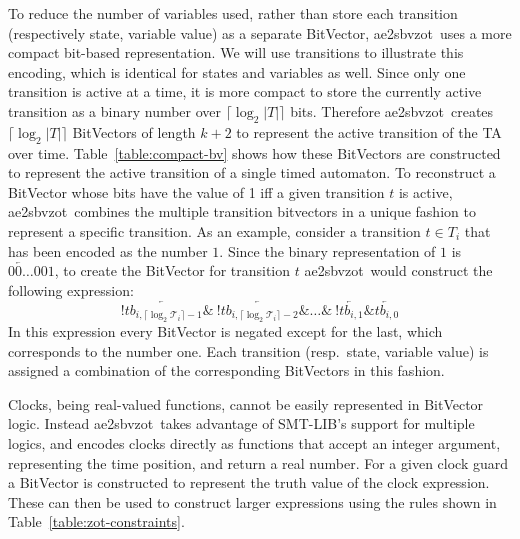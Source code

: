 \documentclass[a4paper,11pt]{report}
\newcommand*\BitAnd{\mathbin{\&}}
\newcommand{\BitNeg}{!}
\theoremstyle{definition}
\newcommand{\aez}{ae2sbvzot}
\begin{document}
To reduce the number of variables used, rather than store each transition
(respectively state, variable value) as a separate BitVector, \aez\ uses a more
compact bit-based representation. We will use transitions to illustrate this
encoding, which is identical for states and variables as well. Since only one
transition is active at a time, it is more compact to store the currently active
transition as a binary number over \(\lceil\log_2 |T|\rceil\) bits.
Therefore \aez\ creates \(\lceil\log_2 |T|\rceil\) BitVectors of
length \(k+2\) to represent the active transition of the TA over time.
Table~\ref{table:compact-bv} shows how these BitVectors are constructed to represent
the active transition of a single timed automaton. To reconstruct a BitVector
whose bits have the value of 1 iff a given transition $t$ is active, \aez\
combines the multiple transition bitvectors in a unique fashion to represent a
specific transition. As an example, consider a transition $t \in T_{i}$ that has
been encoded as the number $1$. Since the binary representation of $1$ is
$\overleftarrow{00\ldots}001$, to create the BitVector for transition $t$ \aez\
would construct the following expression:
\[\BitNeg\overleftarrow{tb_{i,\lceil \log_2 \mathcal{T}_i \rceil -1}} \BitAnd \ \BitNeg\overleftarrow{tb_{i,\lceil \log_2 \mathcal{T}_i \rceil -2}} \BitAnd \ldots \BitAnd \ \BitNeg\overleftarrow{tb_{i,1}} \BitAnd \overleftarrow{tb_{i,0}} \]
In this expression every BitVector is negated except for the last, which
corresponds to the number one. Each transition (resp.\ state, variable value) is
assigned a combination of the corresponding BitVectors in this fashion.


Clocks, being real-valued functions, cannot be easily represented in BitVector
logic. Instead \aez\ takes advantage of SMT-LIB's support for multiple logics,
and encodes clocks directly as functions that accept an integer argument,
representing the time position, and return a real number. For a given clock
guard a BitVector is constructed to represent the truth value of the clock
expression. These can then be used to construct larger expressions using the
rules shown in Table~\ref{table:zot-constraints}.
\end{document}
